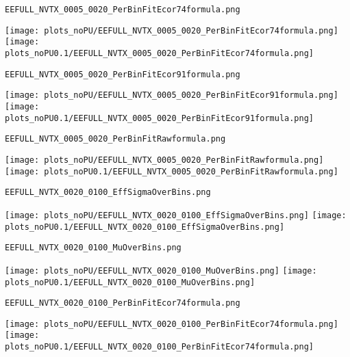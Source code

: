 \begin{frame}[fragile]
\begin{verbatim}
EEFULL_NVTX_0005_0020_PerBinFitEcor74formula.png
\end{verbatim}
\texttt{[image: plots\_noPU/EEFULL\_NVTX\_0005\_0020\_PerBinFitEcor74formula.png]}
\texttt{[image: plots\_noPU0.1/EEFULL\_NVTX\_0005\_0020\_PerBinFitEcor74formula.png]}
\end{frame}
\begin{frame}[fragile]
\begin{verbatim}
EEFULL_NVTX_0005_0020_PerBinFitEcor91formula.png
\end{verbatim}
\texttt{[image: plots\_noPU/EEFULL\_NVTX\_0005\_0020\_PerBinFitEcor91formula.png]}
\texttt{[image: plots\_noPU0.1/EEFULL\_NVTX\_0005\_0020\_PerBinFitEcor91formula.png]}
\end{frame}
\begin{frame}[fragile]
\begin{verbatim}
EEFULL_NVTX_0005_0020_PerBinFitRawformula.png
\end{verbatim}
\texttt{[image: plots\_noPU/EEFULL\_NVTX\_0005\_0020\_PerBinFitRawformula.png]}
\texttt{[image: plots\_noPU0.1/EEFULL\_NVTX\_0005\_0020\_PerBinFitRawformula.png]}
\end{frame}
\begin{frame}[fragile]
\begin{verbatim}
EEFULL_NVTX_0020_0100_EffSigmaOverBins.png
\end{verbatim}
\texttt{[image: plots\_noPU/EEFULL\_NVTX\_0020\_0100\_EffSigmaOverBins.png]}
\texttt{[image: plots\_noPU0.1/EEFULL\_NVTX\_0020\_0100\_EffSigmaOverBins.png]}
\end{frame}
\begin{frame}[fragile]
\begin{verbatim}
EEFULL_NVTX_0020_0100_MuOverBins.png
\end{verbatim}
\texttt{[image: plots\_noPU/EEFULL\_NVTX\_0020\_0100\_MuOverBins.png]}
\texttt{[image: plots\_noPU0.1/EEFULL\_NVTX\_0020\_0100\_MuOverBins.png]}
\end{frame}
\begin{frame}[fragile]
\begin{verbatim}
EEFULL_NVTX_0020_0100_PerBinFitEcor74formula.png
\end{verbatim}
\texttt{[image: plots\_noPU/EEFULL\_NVTX\_0020\_0100\_PerBinFitEcor74formula.png]}
\texttt{[image: plots\_noPU0.1/EEFULL\_NVTX\_0020\_0100\_PerBinFitEcor74formula.png]}
\end{frame}
